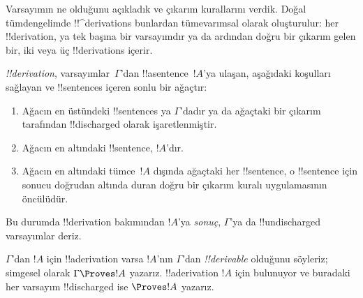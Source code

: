 \documentclass[../../../include/open-logic-section]{subfiles}
\begin{document}
      {}
      {}


\begin{explain}
Varsayımın ne olduğunu açıkladık ve çıkarım kurallarını verdik. Doğal
tümdengelimde !!^{derivation}s bunlardan tümevarımsal olarak oluşturulur: her
!!{derivation}, ya tek başına bir varsayımdır ya da ardından doğru bir
çıkarım gelen bir, iki veya üç !!{derivation}s içerir.
\end{explain}

\begin{defn}[!!^{derivation}]
 \emph{!!{derivation}}, varsayımlar~$\Gamma$'dan
!!a{sentence}~$!A$'ya ulaşan, aşağıdaki koşulları sağlayan ve !!{sentence}s
içeren sonlu bir ağaçtır:
\begin{enumerate}
\item Ağacın en üstündeki !!{sentence}s ya $\Gamma$'dadır ya da ağaçtaki bir
  çıkarım tarafından !!{discharged} olarak işaretlenmiştir.
\item Ağacın en altındaki !!{sentence}, $!A$'dır.
\item Ağacın en altındaki tümce~$!A$ dışında ağaçtaki her !!{sentence},
  o !!{sentence} için sonucu doğrudan altında duran doğru bir çıkarım kuralı
  uygulamasının öncülüdür.
\end{enumerate}
Bu durumda !!{derivation} bakımından $!A$'ya \emph{sonuç}, $\Gamma$'ya da
!!{undischarged} varsayımlar deriz.

$\Gamma$'dan $!A$ için !!a{derivation} varsa $!A$'nın $\Gamma$'dan
\emph{!!{derivable}} olduğunu söyleriz; simgesel olarak $\Gamma \Proves
!A$ yazarız. !!a{derivation} $!A$ için bulunuyor ve buradaki her varsayım
!!{discharged} ise $\Proves !A$ yazarız.
\end{defn}
\end{document}
